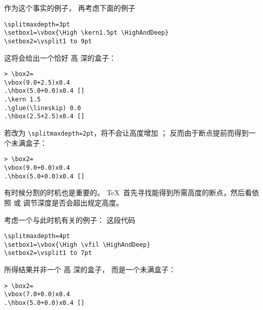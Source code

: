 \documentclass{book}
\begin{document}
作为这个事实的例子，
\alt
再考虑下面的例子
\begin{verbatim}
\splitmaxdepth=3pt 
\setbox1=\vbox{\High \kern1.5pt \HighAndDeep}
\setbox2=\vsplit1 to 9pt
\end{verbatim}
这将会给出一个恰好 \n{9pt} 高 \n{2.5pt} 深的盒子：
\begin{verbatim}
> \box2=
\vbox(9.0+2.5)x0.4
.\hbox(5.0+0.0)x0.4 []
.\kern 1.5
.\glue(\lineskip) 0.0
.\hbox(2.5+2.5)x0.4 []
\end{verbatim}
若改为 \verb>\splitmaxdepth=2pt>，将不会让高度增加 \n{0.5pt}；
反而由于断点提前而得到一个未满盒子：
\begin{verbatim}
> \box2=
\vbox(9.0+0.0)x0.4
.\hbox(5.0+0.0)x0.4 []
\end{verbatim}

有时候分割的时机也是重要的。
\TeX\ 首先寻找能得到所需高度的断点，然后看依照 
或  调节深度是否会超出规定高度。

考虑一个与此时机有关的例子：
\alt
这段代码
\begin{verbatim}
\splitmaxdepth=4pt 
\setbox1=\vbox{\High \vfil \HighAndDeep}
\setbox2=\vsplit1 to 7pt
\end{verbatim}
所得结果{\italic 并非\/}一个 \n{7pt} 高 \n{3pt} 深的盒子，
而是一个未满盒子：
\begin{verbatim}
> \box2=
\vbox(7.0+0.0)x0.4
.\hbox(5.0+0.0)x0.4 []
\end{verbatim}
\end{document}
